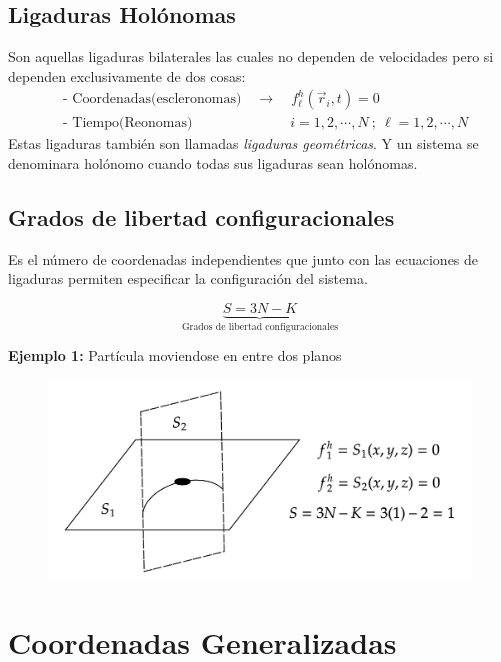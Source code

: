 \documentclass[../main]{subfiles}
\begin{document}
\subsection*{Ligaduras Holónomas}
Son aquellas ligaduras bilaterales las cuales no dependen de velocidades pero si dependen exclusivamente de dos cosas:
\begin{align*}
    &\text{- Coordenadas(escleronomas)} \quad \rightarrow \quad f_{\ell}^h(\vec{r}_i,t)=0 \\
    &\text{- Tiempo(Reonomas)} \qquad \qquad \qquad \quad i=1,2,\cdots, N \ ; \ \ell =1,2,\cdots,N
\end{align*}
Estas ligaduras también son llamadas \textit{ligaduras geométricas}. Y un sistema se denominara holónomo cuando todas sus ligaduras sean holónomas.

\subsection*{Grados de libertad configuracionales}

Es el número de coordenadas independientes que junto con las ecuaciones de ligaduras permiten especificar la configuración del sistema.

\begin{equation}
    \underbrace{S=3N-K}_{\text{Grados de libertad configuracionales}}
    \label{eq44}
\end{equation}

\textbf{Ejemplo 1:} Partícula moviendose en entre dos planos

\begin{figure}[ht]
    \centering
    \includegraphics[scale=0.213]{../assets/images/lig6.png}
    \label{fig:fig6}
\end{figure}

\section{Coordenadas Generalizadas}
\end{document}
